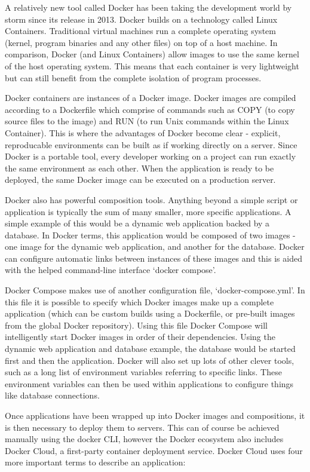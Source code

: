     A relatively new tool called Docker has been taking the development world by storm since its release in 2013. Docker builds on a technology called Linux Containers. Traditional virtual machines run a complete operating system (kernel, program binaries and any other files) on top of a host machine. In comparison, Docker (and Linux Containers) allow images to use the same kernel of the host operating system. This means that each container is very lightweight but can still benefit from the complete isolation of program processes.

    Docker containers are instances of a Docker image. Docker images are compiled according to a Dockerfile which comprise of commands such as COPY (to copy source files to the image) and RUN (to run Unix commands within the Linux Container). This is where the advantages of Docker become clear - explicit, reproducable environments can be built as if working directly on a server. Since Docker is a portable tool, every developer working on a project can run exactly the same environment as each other. When the application is ready to be deployed, the same Docker image can be executed on a production server.

    Docker also has powerful composition tools. Anything beyond a simple script or application is typically the sum of many smaller, more specific applications. A simple example of this would be a dynamic web application backed by a database. In Docker terms, this application would be composed of two images - one image for the dynamic web application, and another for the database. Docker can configure automatic links between instances of these images and this is aided with the helped command-line interface `docker compose'.

    Docker Compose makes use of another configuration file, `docker-compose.yml'. In this file it is possible to specify which Docker images make up a complete application (which can be custom builds using a Dockerfile, or pre-built images from the global Docker repository). Using this file Docker Compose will intelligently start Docker images in order of their dependencies. Using the dynamic web application and database example, the database would be started first and then the application. Docker will also set up lots of other clever tools, such as a long list of environment variables referring to specific links. These environment variables can then be used within applications to configure things like database connections.

    Once applications have been wrapped up into Docker images and compositions, it is then necessary to deploy them to servers. This can of course be achieved manually using the docker CLI, however the Docker ecosystem also includes Docker Cloud, a first-party container deployment service. Docker Cloud uses four more important terms to describe an application:

